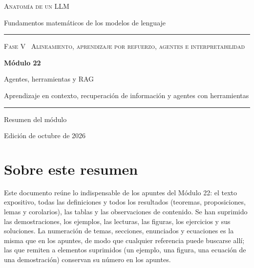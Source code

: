 \documentclass[11pt,a4paper,twoside,openany]{book}
\begin{document}
\frontmatter
\begin{titlepage}
\centering
\vspace*{2.5cm}
{\large\scshape Anatomía de un LLM}\par
\vspace{0.4cm}
{\normalsize Fundamentos matemáticos de los modelos de lenguaje}\par
\vspace{2.2cm}
\rule{\textwidth}{0.8pt}\par\vspace{0.5cm}
{\small\scshape Fase V \textperiodcentered\ Alineamiento, aprendizaje por refuerzo, agentes e interpretabilidad}\par\vspace{0.3cm}
{\Huge\bfseries Módulo 22\par}\vspace{0.3cm}
{\LARGE Agentes, herramientas y RAG\par}
\vspace{0.2cm}
{\large Aprendizaje en contexto, recuperación de información y agentes con herramientas\par}
\vspace{0.5cm}\rule{\textwidth}{0.4pt}\par
\vspace{1.6cm}
{\large Resumen del módulo}\par
\vfill
{\small Edición de octubre de 2026}\par
\end{titlepage}

\chapter*{Sobre este resumen}

Este documento reúne lo indispensable de los apuntes del Módulo 22: el texto expositivo, todas las definiciones y todos los resultados (teoremas, proposiciones, lemas y corolarios), las tablas y las observaciones de contenido. Se han suprimido las demostraciones, los ejemplos, las lecturas, las figuras, los ejercicios y sus soluciones. La numeración de temas, secciones, enunciados y ecuaciones es la misma que en los apuntes, de modo que cualquier referencia puede buscarse allí; las que remiten a elementos suprimidos (un ejemplo, una figura, una ecuación de una demostración) conservan su número en los apuntes.
\end{document}
